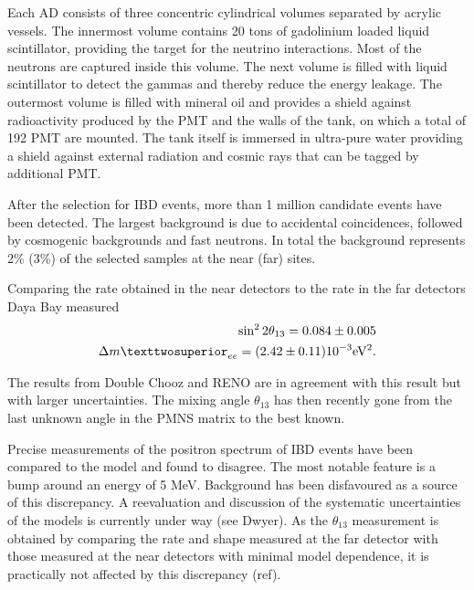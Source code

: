 Each AD consists of three concentric cylindrical volumes separated by acrylic vessels. The innermost volume contains 20 tons of gadolinium loaded liquid scintillator, providing the target for the neutrino interactions. Most of the neutrons are captured inside this volume. The next volume is filled with liquid scintillator to detect the gammas and thereby reduce the energy leakage. The outermost volume is filled with mineral oil and provides a shield against radioactivity produced by the PMT and the walls of the tank, on which a total of 192 PMT are mounted. The tank itself is immersed in ultra-pure water providing a shield against external radiation and cosmic rays that can be tagged by additional PMT. 

After the selection for IBD events, more than 1 million candidate events have been detected. The largest background is due to accidental coincidences, followed by cosmogenic backgrounds and fast neutrons. In total the background represents 2\% (3\%) of the selected samples at the near (far) sites.

Comparing the rate obtained in the near detectors to the rate in the far detectors Daya Bay measured 
\begin{eqnarray}
\sin^2 2 \theta_{13} = 0.084 \pm 0.005 \\
\Delta m²_{ee} = (2.42 \pm 0.11) 10^{-3} {\rm eV^2}.
\end{eqnarray}

The results from Double Chooz and RENO are in agreement with this result but with larger uncertainties. The mixing angle $\theta_{13}$ has then recently gone from the last unknown angle in the PMNS matrix to the best known.

Precise measurements of the positron spectrum of IBD events have been compared to the model and found to disagree. The most notable feature is a bump around an energy of 5 MeV. Background has been disfavoured as a source of this discrepancy. A reevaluation and discussion of the systematic uncertainties of the models is currently under way (see Dwyer).
As the $\theta_{13}$ measurement is obtained by comparing the rate and shape measured at the far detector with those measured at the near detectors with minimal model dependence, it is practically not affected by this discrepancy (ref).



